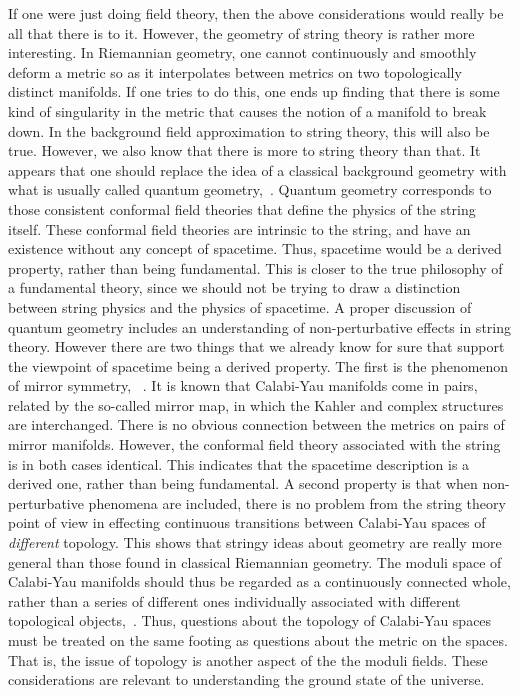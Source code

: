 \documentclass{article}
\begin{document}
If one were just doing field theory, then the above considerations would
really be all that there is to it. However, the geometry of string
theory is rather more interesting. In Riemannian geometry, one cannot
continuously and smoothly deform a metric so as it interpolates between
metrics on two topologically distinct manifolds. If one tries to do
this, one ends up  finding that there is some kind of singularity in
the metric that causes the notion of a manifold to break down. In the
background field approximation to string theory, this will also be
true. However, we also know that there is more to string theory than
that. It appears that one should replace the idea of a classical
background geometry with what is usually called quantum geometry,~\cite{BG:qg}.
Quantum geometry corresponds to those
consistent conformal field theories that define the physics of the
string itself. These conformal field theories are intrinsic to the
string, and have an existence without any concept of spacetime. Thus,
spacetime would be a derived property, rather than being
fundamental. This is closer to the true philosophy of a fundamental
theory, since we should not be trying to draw a distinction between
string physics and the physics of spacetime. A proper discussion of
quantum geometry includes an understanding of non-perturbative effects
in string theory.  However there are two things that we already know for
sure that support the viewpoint of spacetime being a derived property.
The first is the phenomenon of mirror symmetry, ~\cite{BG:elegant}.
It is known that
Calabi-Yau manifolds come in pairs, related by the so-called mirror map,
in which the Kahler and complex structures are interchanged. There is no
obvious connection between the metrics on pairs of mirror manifolds.
However, the conformal field theory associated with the string is in
both cases identical. This indicates that the spacetime description is a
derived one, rather than being fundamental. A second property is that
when non-perturbative phenomena are included, there is no problem from
the string theory point of view in effecting continuous transitions
between Calabi-Yau spaces of {\it different} topology. This shows that
stringy ideas about geometry are really more general than those found in
classical Riemannian geometry. The moduli space of Calabi-Yau manifolds
should thus be regarded as a continuously connected whole, rather than a
series of different ones individually associated with different
topological objects,~\cite{PC:roll}.
Thus, questions about the topology of Calabi-Yau
spaces must be treated on the same footing as questions about the metric
on the spaces. That is, the issue of topology is another aspect of the
the moduli fields.  These considerations are relevant to understanding
the ground state of the universe.
\end{document}
